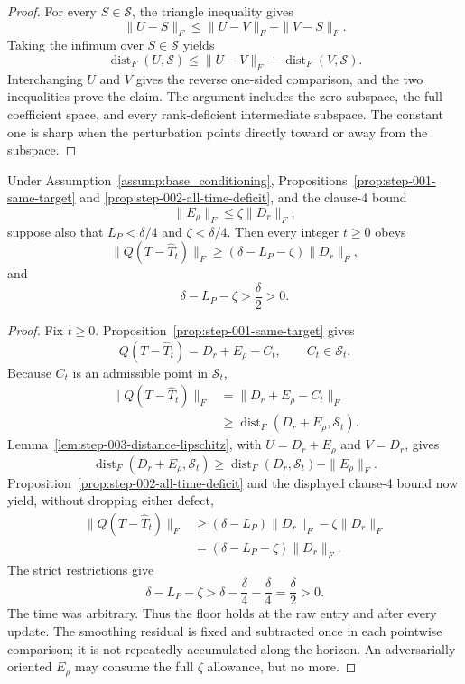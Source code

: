 \begin{proof}
For every $S\in\mathcal S$, the triangle inequality gives
\[
\|U-S\|_F\leq\|U-V\|_F+\|V-S\|_F.
\]
Taking the infimum over $S\in\mathcal S$ yields
\[
\operatorname{dist}_F(U,\mathcal S)
\leq\|U-V\|_F+\operatorname{dist}_F(V,\mathcal S).
\]
Interchanging $U$ and $V$ gives the reverse one-sided comparison, and the
two inequalities prove the claim.  The argument includes the zero subspace,
the full coefficient space, and every rank-deficient intermediate subspace.
The constant one is sharp when the perturbation points directly toward or
away from the subspace.
\end{proof}

\begin{proposition}
\label{prop:step-003-coefficient-floor}
Under Assumption~\ref{assump:base_conditioning},
Propositions~\ref{prop:step-001-same-target} and
\ref{prop:step-002-all-time-deficit}, and the clause-4 bound
\[
\|E_\rho\|_F\leq\zeta\|D_r\|_F,
\]
suppose also that $L_P<\delta/4$ and $\zeta<\delta/4$.  Then every
integer $t\geq0$ obeys
\[
\|Q(T-\widehat T_t)\|_F
\geq(\delta-L_P-\zeta)\|D_r\|_F,
\]
and
\[
\delta-L_P-\zeta>\frac{\delta}{2}>0.
\]
\end{proposition}

\begin{proof}
Fix $t\geq0$.  Proposition~\ref{prop:step-001-same-target} gives
\[
Q(T-\widehat T_t)=D_r+E_\rho-C_t,
\qquad C_t\in\mathcal S_t.
\]
Because $C_t$ is an admissible point in $\mathcal S_t$,
\[
\begin{aligned}
\|Q(T-\widehat T_t)\|_F
&=\|D_r+E_\rho-C_t\|_F\\
&\geq\operatorname{dist}_F(D_r+E_\rho,\mathcal S_t).
\end{aligned}
\]
Lemma~\ref{lem:step-003-distance-lipschitz}, with
$U=D_r+E_\rho$ and $V=D_r$, gives
\[
\operatorname{dist}_F(D_r+E_\rho,\mathcal S_t)
\geq
\operatorname{dist}_F(D_r,\mathcal S_t)-\|E_\rho\|_F.
\]
Proposition~\ref{prop:step-002-all-time-deficit} and the displayed
clause-4 bound now yield, without dropping either defect,
\[
\begin{aligned}
\|Q(T-\widehat T_t)\|_F
&\geq(\delta-L_P)\|D_r\|_F-\zeta\|D_r\|_F\\
&=(\delta-L_P-\zeta)\|D_r\|_F.
\end{aligned}
\]
The strict restrictions give
\[
\delta-L_P-\zeta
>\delta-\frac{\delta}{4}-\frac{\delta}{4}
=\frac{\delta}{2}>0.
\]
The time was arbitrary.  Thus the floor holds at the raw entry and after
every update.  The smoothing residual is fixed and subtracted once in each
pointwise comparison; it is not repeatedly accumulated along the horizon.
An adversarially oriented $E_\rho$ may consume the full $\zeta$ allowance,
but no more.
\end{proof}

